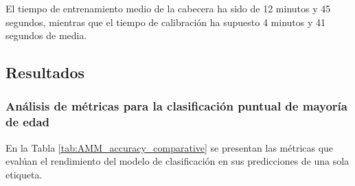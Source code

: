 El tiempo de entrenamiento medio de la cabecera ha sido de 12 minutos y 45 segundos, mientras que el tiempo de calibración ha supuesto 4 minutos y 41 segundos de media. 

\subsection{Resultados}

\subsubsection{Análisis de métricas para la clasificación puntual de mayoría de edad}

En la Tabla \ref{tab:AMM_accuracy_comparative} se presentan las métricas que evalúan el rendimiento del modelo de clasificación en sus predicciones de una sola etiqueta.


